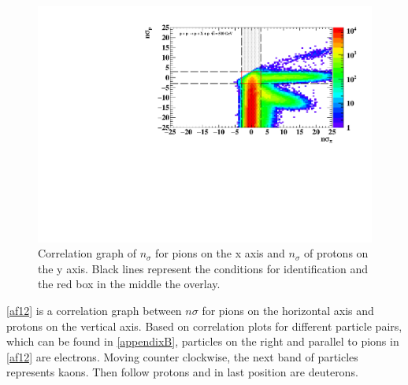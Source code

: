 \FloatBarrier
\begin{figure}[ht]
    \centering
    \includegraphics[width=1\textwidth]{figures/hNSigmaPiPcorr.pdf}
    \caption[Correlation graph of $n\sigma_{\pi}$ and $n\sigma_{p}$  of measured particles]{Correlation graph of $n_{\sigma}$ for pions on the x axis and $n_{\sigma}$ of protons on the y axis. Black lines represent the conditions for identification and the red box in the middle the overlay.}
    \label{af12}
\end{figure}
\FloatBarrier
\autoref{af12} is a correlation graph between $n \sigma$ for pions on the horizontal axis and protons on the vertical axis. Based on correlation plots for different particle pairs, which can be found in \autoref{appendixB}, particles on the right and parallel to pions in \autoref{af12} are electrons. Moving counter clockwise, the next band of particles represents kaons. Then follow protons and in last position are deuterons. 
